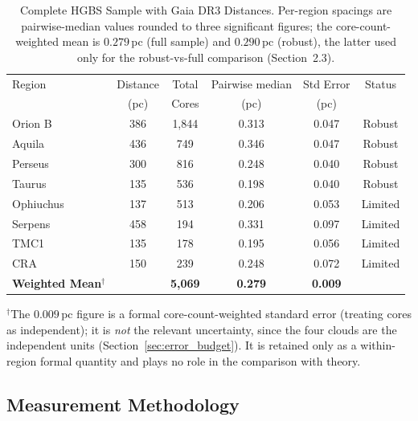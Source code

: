 \documentclass[usenatbib,twoside,twocolumn]{mnras}
\begin{document}
\begin{table}
\caption{Complete HGBS Sample with Gaia DR3 Distances. Per-region spacings are pairwise-median values rounded to three significant figures; the core-count-weighted mean is $0.279$\,pc (full sample) and $0.290$\,pc (robust), the latter used only for the robust-vs-full comparison (Section~2.3).}
\label{tab:sample}
\begin{tabular}{lccccc}
\toprule
Region & Distance & Total & Pairwise median & Std Error & Status \\
       & (pc)   & Cores & (pc)   & (pc)      &  \\
\midrule
Orion B  & 386 & 1,844 & 0.313 & 0.047 & Robust \\
Aquila   & 436 & 749   & 0.346 & 0.047 & Robust \\
Perseus  & 300 & 816   & 0.248 & 0.040 & Robust \\
Taurus   & 135 & 536   & 0.198 & 0.040 & Robust \\
Ophiuchus& 137 & 513   & 0.206 & 0.053 & Limited \\
Serpens  & 458 & 194   & 0.331 & 0.097 & Limited \\
TMC1     & 135 & 178   & 0.195 & 0.056 & Limited \\
CRA      & 150 & 239   & 0.248 & 0.072 & Limited \\
\midrule
\textbf{Weighted Mean}$^\dagger$ &  & \textbf{5,069} & \textbf{0.279} & \textbf{0.009} &  \\
\bottomrule
\end{tabular}
\par\vspace{2pt}
\footnotesize $^\dagger$The $0.009$\,pc figure is a formal core-count-weighted standard error (treating cores as independent); it is \emph{not} the relevant uncertainty, since the four clouds are the independent units (Section~\ref{sec:error_budget}). It is retained only as a within-region formal quantity and plays no role in the comparison with theory.
\end{table}

\subsection{Measurement Methodology}
\label{sec:methodology}
\end{document}
